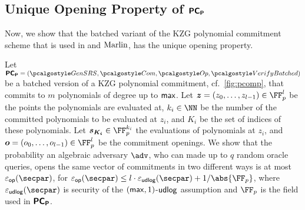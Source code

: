 \subsection{Unique Opening Property of $\bm{\mathsf{PC}}_{\bm{\mathsf{P}}}$}
Now, we show that the batched variant of the KZG polynomial
commitment scheme that is used in \plonk{} and ${\textnormal{{Marlin}}}{}$, has the unique opening property.

\begin{lemma}
\label{lem:pcomp_op}
Let $\PCOMp = (\kgen, \com, \open, \verifyb)$ be a batched version of a KZG polynomial commitment,
cf.~\cref{fig:pcomp}, that commits to $m$ polynomials of degree up to $\mathsf{max}$. Let $\vec{z} = (z_0, \ldots, z_{l - 1}) \in \FF_p^l$ be the points the polynomials are  evaluated at, $k_i \in \NN$ be the number of the committed polynomials to be evaluated at $z_i$, and $K_i$ be the set of indices of these polynomials. Let $\vec{s_{K_i}} \in \FF_p^{k_i}$ the evaluations of polynomials at $z_i$, and $\vec{o} = (o_0, \ldots, o_{l - 1}) \in \FF_p^l$ be the commitment openings. We show that the probability an algebraic adversary $\adv$, who can made up to $q$ random oracle queries, opens the same vector of commitments in two different ways is at most $\epsop(\secpar)$, for $\epsop(\secpar) \leq l \cdot  \epsudlog(\secpar) + \infrac{1}{\abs{\FF_p}}$, where $\epsudlog(\secpar)$ is security of the $(\mathsf{max}, 1)$-$\mathsf{udlog}$ assumption and $\FF_p$ is the field used in $\bm{\mathsf{PC}}_{\bm{\mathsf{P}}}$.
\end{lemma}
